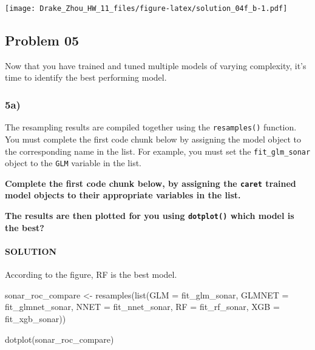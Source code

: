 \documentclass[
]{article}
\newenvironment{Shaded}{\begin{snugshade}}{\end{snugshade}}
\newcommand{\AttributeTok}[1]{\textcolor[rgb]{0.77,0.63,0.00}{#1}}
\newcommand{\FunctionTok}[1]{\textcolor[rgb]{0.00,0.00,0.00}{#1}}
\newcommand{\NormalTok}[1]{#1}
\newcommand{\OtherTok}[1]{\textcolor[rgb]{0.56,0.35,0.01}{#1}}
\begin{document}
\texttt{[image: Drake\_Zhou\_HW\_11\_files/figure-latex/solution\_04f\_b-1.pdf]}

\hypertarget{problem-05}{%
\subsection{Problem 05}\label{problem-05}}

Now that you have trained and tuned multiple models of varying
complexity, it's time to identify the best performing model.

\hypertarget{a-4}{%
\subsubsection{5a)}\label{a-4}}

The resampling results are compiled together using the
\texttt{resamples()} function. You must complete the first code chunk
below by assigning the model object to the corresponding name in the
list. For example, you must set the \texttt{fit\_glm\_sonar} object to
the \texttt{GLM} variable in the list.

\textbf{Complete the first code chunk below, by assigning the
\texttt{caret} trained model objects to their appropriate variables in
the list.}

\textbf{The results are then plotted for you using \texttt{dotplot()}
which model is the best?}

\hypertarget{solution-23}{%
\paragraph{SOLUTION}\label{solution-23}}

According to the figure, RF is the best model.

\begin{Shaded}
\begin{Highlighting}[]
\NormalTok{sonar\_roc\_compare }\OtherTok{\textless{}{-}} \FunctionTok{resamples}\NormalTok{(}\FunctionTok{list}\NormalTok{(}\AttributeTok{GLM =}\NormalTok{ fit\_glm\_sonar,}
                                    \AttributeTok{GLMNET =}\NormalTok{ fit\_glmnet\_sonar,}
                                    \AttributeTok{NNET =}\NormalTok{ fit\_nnet\_sonar,}
                                    \AttributeTok{RF =}\NormalTok{ fit\_rf\_sonar,}
                                    \AttributeTok{XGB =}\NormalTok{ fit\_xgb\_sonar))}

\FunctionTok{dotplot}\NormalTok{(sonar\_roc\_compare)}
\end{Highlighting}
\end{Shaded}
\end{document}
